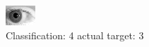 \begin{figure}[h!]
\begin{center}
\includegraphics[width=0.60\columnwidth]{figures/ID219_class_4_target_3.png}
\end{center}
\caption{ Classification: 4 actual target: 3}
\label{fig:ID219_class_4_target_3}
\end{figure}
